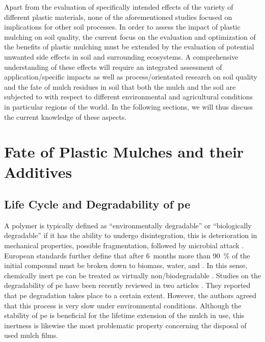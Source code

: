 Apart from the evaluation of specifically intended effects of the variety of different plastic materials, none of the aforementioned studies focused on implications for other soil processes. In order to assess the impact of plastic mulching on soil quality, the current focus on the evaluation and optimization of the benefits of plastic mulching must be extended by the evaluation of potential unwanted side effects in soil and surrounding ecosystems. A comprehensive understanding of these effects will require an integrated assessment of application\-/specific impacts as well as process\-/orientated research on soil quality and the fate of mulch residues in soil that both the mulch and the soil are subjected to with respect to different environmental and agricultural conditions in particular regions of the world. In the following sections, we will thus discuss the current knowledge of these aspects.

\section{Fate of Plastic Mulches and their Additives}
\label{sec:plastic-mulching:fate}

\subsection{Life Cycle and Degradability of \Acs{pe}}
\label{sec:plastic-mulching:life-cycle}

A polymer is typically defined as ``environmentally degradable'' or ``biologically degradable'' if it has the ability to undergo disintegration, this is deterioration in mechanical properties, possible fragmentation, followed by microbial attack \citep{KrzanStandardization2006}. European standards further define that after \num{6}~months more than \SI{90}{\percent} of the initial compound must be broken down to biomass, water, and  \citep{DINEN13432Packaging2000}. In this sense, chemically inert \ac{pe} can be treated as virtually non\-/biodegradable \citep{AlbertssonMechanism1987}. Studies on the degradability of \ac{pe} have been recently reviewed in two articles \citep{KruegerProspects2015,Restrepo-FlorezMicrobial2014}. They reported that \ac{pe} degradation takes place to a certain extent. However, the authors agreed that this process is very slow under environmental conditions. Although the stability of \ac{pe} is beneficial for the lifetime extension of the mulch in use, this inertness is likewise the most problematic property concerning the disposal of used mulch films.

